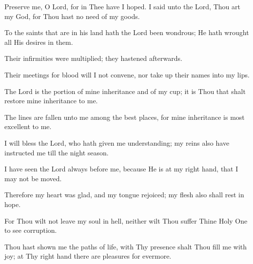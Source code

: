 Preserve me, O Lord, for in Thee have I hoped. I said unto the Lord, Thou art my God, for Thou hast no need of my goods.

To the saints that are in his land hath the Lord been wondrous; He hath wrought all His desires in them.

Their infirmities were multiplied; they hastened afterwards.

Their meetings for blood will I not convene, nor take up their names into my lips.

The Lord is the portion of mine inheritance and of my cup; it is Thou that shalt restore mine inheritance to me.

The lines are fallen unto me among the best places, for mine inheritance is most excellent to me.

I will bless the Lord, who hath given me understanding; my reins also have instructed me till the night season.

I have seen the Lord always before me, because He is at my right hand, that I may not be moved.

Therefore my heart was glad, and my tongue rejoiced; my flesh also shall rest in hope.

For Thou wilt not leave my soul in hell, neither wilt Thou suffer Thine Holy One to see corruption.

Thou hast shown me the paths of life, with Thy presence shalt Thou fill me with joy; at Thy right hand there are pleasures for evermore.
